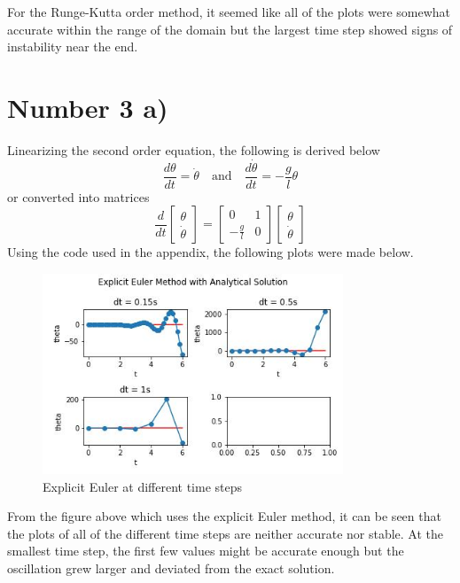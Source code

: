 \documentclass{article}
\begin{document}
		For the Runge-Kutta  order method, it seemed like all of the plots were somewhat accurate within the range of the domain but the largest time step showed signs of instability near the end. 
	
	\section*{Number 3 a)}
		Linearizing the second order equation, the following is derived below
		$$ \frac{d\theta}{dt} = \dot{\theta} \quad \mathrm{and} \quad \frac{d\dot{\theta}}{dt} = -\frac{g}{l} \theta  $$
		or converted into matrices
		$$\frac{d}{dt} \begin{bmatrix}\theta \\ \dot{\theta} \end{bmatrix} = \begin{bmatrix} 0 & 1 \\ -\frac{g}{l} & 0 \end{bmatrix} \begin{bmatrix}\theta \\ \dot{\theta} \end{bmatrix} $$
		Using the code used in the appendix, the following plots were made below.
		\begin{figure}[H]
			\centering
			\includegraphics[width=0.8\textwidth]{images/exp3a.jpg}
			\caption{\label{} Explicit Euler at different time steps}
		\end{figure}
		From the figure above which uses the explicit Euler method, it can be seen that the plots of all of the different time steps are neither accurate nor stable. At the smallest time step, the first few values might be accurate enough but the oscillation grew larger and deviated from the exact solution.
\end{document}
